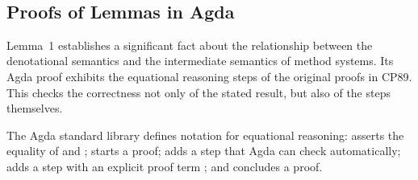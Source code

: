 \begin{AgdaAlign}
\begin{code}
\AgdaSpace{}%
\<%
\\
%
\>[2]\AgdaSpace{}%
\<%
\\
%
\>[2]\AgdaSpace{}%
\AgdaSpace{}%
\AgdaSpace{}%
\AgdaSpace{}%
\AgdaSymbol{(}\AgdaSymbol{)}\<%
\\
%
\>[2]\AgdaSpace{}%
\AgdaSpace{}%
\AgdaSpace{}%
\AgdaSpace{}%
\AgdaSymbol{(}\AgdaSpace{}%
\AgdaSpace{}%
\AgdaSymbol{)}\AgdaSpace{}%
\AgdaSpace{}%
\AgdaSymbol{(}\AgdaSymbol{)}\<%
\\
%
\>[2]\AgdaSpace{}%
\AgdaModule{\AgdaUnderscore{}}\<%
\\
\>[2][@{}l@{\AgdaIndent{0}}]%
\>[6]\AgdaSymbol{(}\AgdaSpace{}%
\AgdaSpace{}%
\AgdaSymbol{:}\AgdaSpace{}%
\AgdaSpace{}%
\AgdaSpace{}%
\AgdaSpace{}%
\AgdaSymbol{)}\<%
\\
\>[2][@{}l@{\AgdaIndent{0}}]%
\>[4]\<%
\end{code}

\subsection{Proofs of Lemmas in Agda}

Lemma~1 establishes a significant fact about the relationship
between the denotational semantics and the intermediate semantics of method systems.
Its Agda proof exhibits the equational reasoning steps of the original proofs in CP89.
This checks the correctness not only of the stated result, but also of the steps themselves.

The Agda standard library defines notation for equational reasoning:
 asserts the equality of  and ;
 starts a proof;
 adds a step that Agda can check automatically;
 adds a step with an explicit proof term ;
and  concludes a proof.


\end{AgdaAlign}
